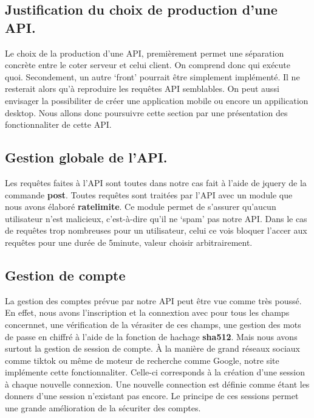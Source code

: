 \documentclass[12pt]{article}
\begin{document}
    \subsection{Justification du choix de production d'une API.}

    Le choix de la production d'une API, premièrement permet une séparation 
    concrète entre le coter serveur et celui client. On comprend donc qui 
    exécute quoi. Secondement, un autre `front' pourrait être simplement 
    implémenté. Il ne resterait alors qu'à reproduire les requêtes API semblables. 
    On peut aussi envisager la possibiliter de créer une application mobile ou 
    encore un appilication desktop. 
    Nous allons donc poursuivre cette section par une présentation des 
    fonctionnaliter de cette API.

    \subsection{Gestion globale de l'API.}

    Les requêtes faites à l'API sont toutes dans notre cas fait à l'aide de 
    jquery de la commande \textbf{post}. Toutes requêtes sont traitées par l'API 
    avec un module que nous avons élaboré \textbf{ratelimite}. Ce module permet 
    de s'assurer qu'aucun utilisateur n'est malicieux, c'est-à-dire qu'il ne 
    `spam' pas notre API. Dans le cas de requêtes trop nombreuses pour un 
    utilisateur, celui ce vois bloquer l'accer aux requêtes pour une durée de 
    5minute, valeur choisir arbitrairement.

    \subsection{Gestion de compte}

    La gestion des comptes prévue par notre API peut être vue comme très poussé. 
    En effet, nous avons l'inscription et la connextion avec pour tous les 
    champs concernnet, une vérification de la vérasiter de ces champs, une 
    gestion des mots de passe en chiffré à l'aide de la fonction de hachage 
    \textbf{sha512}. Mais nous avons surtout la gestion de session de compte. À 
    la manière de grand réseaux sociaux comme tiktok ou même de moteur de 
    recherche comme Google, notre site implémente cette fonctionnaliter. 
    Celle-ci corresponds à la création d'une session à chaque nouvelle connexion.
    Une nouvelle connection est définie comme étant les donners d'une session 
    n'existant pas encore. Le principe de ces sessions permet une grande 
    amélioration de la sécuriter des comptes.
\end{document}
